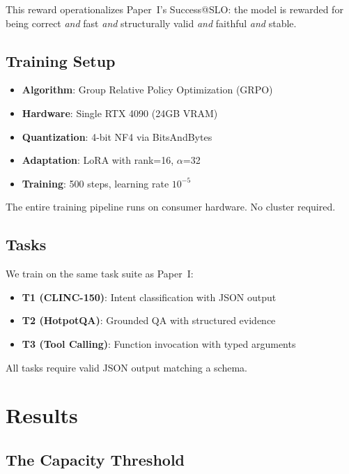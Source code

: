 \documentclass[11pt]{article}
\begin{document}
This reward operationalizes Paper~I's Success@SLO: the model is rewarded for being correct \emph{and} fast \emph{and} structurally valid \emph{and} faithful \emph{and} stable.

\subsection{Training Setup}

\begin{itemize}[leftmargin=12pt]
    \item \textbf{Algorithm}: Group Relative Policy Optimization (GRPO)~\citep{shao2024grpo}
    \item \textbf{Hardware}: Single RTX 4090 (24GB VRAM)
    \item \textbf{Quantization}: 4-bit NF4 via BitsAndBytes
    \item \textbf{Adaptation}: LoRA with rank=16, $\alpha$=32
    \item \textbf{Training}: 500 steps, learning rate $10^{-5}$
\end{itemize}

The entire training pipeline runs on consumer hardware.
No cluster required.

\subsection{Tasks}

We train on the same task suite as Paper~I:
\begin{itemize}[leftmargin=12pt]
    \item \textbf{T1 (CLINC-150)}: Intent classification with JSON output
    \item \textbf{T2 (HotpotQA)}: Grounded QA with structured evidence
    \item \textbf{T3 (Tool Calling)}: Function invocation with typed arguments
\end{itemize}

All tasks require valid JSON output matching a schema.

\section{Results}

\subsection{The Capacity Threshold}
\end{document}
